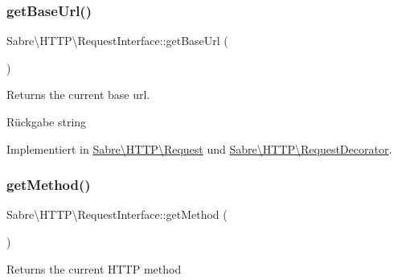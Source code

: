 \mbox{\label{interface_sabre_1_1_h_t_t_p_1_1_request_interface_af5683bbd6dfff74d91ac4620ae328feb}} 
\subsubsection{\texorpdfstring{get\+Base\+Url()}{getBaseUrl()}}
{\footnotesize\ttfamily Sabre\textbackslash{}\+H\+T\+T\+P\textbackslash{}\+Request\+Interface\+::get\+Base\+Url (\begin{DoxyParamCaption}{ }\end{DoxyParamCaption})}

Returns the current base url.

\begin{DoxyReturn}{Rückgabe}
string 
\end{DoxyReturn}


Implementiert in \mbox{\hyperlink{class_sabre_1_1_h_t_t_p_1_1_request_a959a5d2f95e4545290e419906c4e417a}{Sabre\textbackslash{}\+H\+T\+T\+P\textbackslash{}\+Request}} und \mbox{\hyperlink{class_sabre_1_1_h_t_t_p_1_1_request_decorator_ae083a7f3c8138b06e8beae5dfca6fd92}{Sabre\textbackslash{}\+H\+T\+T\+P\textbackslash{}\+Request\+Decorator}}.

\mbox{\label{interface_sabre_1_1_h_t_t_p_1_1_request_interface_a261109b4898971242fccc2097a880131}} 
\subsubsection{\texorpdfstring{get\+Method()}{getMethod()}}
{\footnotesize\ttfamily Sabre\textbackslash{}\+H\+T\+T\+P\textbackslash{}\+Request\+Interface\+::get\+Method (\begin{DoxyParamCaption}{ }\end{DoxyParamCaption})}

Returns the current H\+T\+TP method

